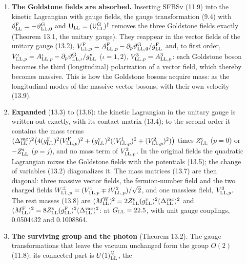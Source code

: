 \documentclass[
  10pt,
]{article}
\providecommand{\tightlist}{%
  \setlength{\itemsep}{0pt}\setlength{\parskip}{0pt}}
\begin{document}
\begin{enumerate}
\def\labelenumi{\arabic{enumi}.}
\tightlist
\item
  \textbf{The Goldstone fields are absorbed.} Inserting SFBSv (11.9)
  into the kinetic Lagrangian with gauge fields, the gauge
  transformation (9.4) with
  \(\theta^{\rm F}_{\rm LL}=-\vartheta^{\rm G}_{{\rm LL},0}\) and
  \(\mathsf U_{\rm LL}=(\mathsf U^{\rm G}_{\rm LL})^\dagger\) removes
  the three Goldstone fields exactly (Theorem 13.1, the unitary gauge).
  They reappear in the vector fields of the unitary gauge (13.2),
  \(V^{\rm F}_{{\rm LL},p}=A^{\rm F}_{{\rm LL},p}-\partial_p\vartheta^{\rm G}_{{\rm LL},0}/g^{\rm F}_{\rm LL}\)
  and, to first order,
  \(V^\iota_{{\rm LL},p}=A^\iota_{{\rm LL},p}-\partial_p\vartheta^{\rm G}_{{\rm LL},\iota}/g^{\rm v}_{\rm LL}\)
  (\(\iota=1,2\)), \(V^3_{{\rm LL},p}=A^3_{{\rm LL},p}\): each Goldstone
  boson becomes the third (longitudinal) polarization of a vector field,
  which thereby becomes massive. This is how the Goldstone bosons
  acquire mass: as the longitudinal modes of the massive vector bosons,
  with their own velocity (13.9).
\item
  \textbf{Expanded} (13.3) to (13.6): the kinetic Lagrangian in the
  unitary gauge is written out exactly, with its contact matrix (13.4);
  to the second order it contains the mass terms
  \((\Delta^{\rm vac}_{\rm LL})^2\big(4(g^{\rm F}_{\rm LL})^2(V^{\rm F}_{{\rm LL},p})^2+(g^{\rm v}_{\rm LL})^2((V^1_{{\rm LL},p})^2+(V^2_{{\rm LL},p})^2)\big)\)
  times \(Z^{\rm t}_{\rm LL}\) (\(p=0\)) or \(-Z^{\rm s}_{\rm LL}\)
  (\(p=j\)), and no mass term of \(V^3_{{\rm LL},p}\). In the original
  fields the quadratic Lagrangian mixes the Goldstone fields with the
  potentials (13.5); the change of variables (13.2) diagonalizes it. The
  mass matrices (13.7) are then diagonal: three massive vector fields,
  the fermion-number field and the two charged fields
  \(W^\pm_{{\rm LL},p}=(V^1_{{\rm LL},p}\mp iV^2_{{\rm LL},p})/\sqrt2\),
  and one massless field, \(V^3_{{\rm LL},p}\). The rest masses (13.8)
  are
  \((M^{\rm W}_{\rm LL})^2=2Z^{\rm s}_{\rm LL}(g^{\rm v}_{\rm LL})^2(\Delta^{\rm vac}_{\rm LL})^2\)
  and
  \((M^{\rm F}_{\rm LL})^2=8Z^{\rm s}_{\rm LL}(g^{\rm F}_{\rm LL})^2(\Delta^{\rm vac}_{\rm LL})^2\):
  at \(G_{\rm LL}=22.5\), with unit gauge couplings, 0.0504432 and
  0.1008864.
\item
  \textbf{The surviving group and the photon} (Theorem 13.2). The gauge
  transformations that leave the vacuum unchanged form the group
  \(O(2)\) (11.8); its connected part is \(U(1)^{\rm Q}_{\rm LL}\), the

\end{enumerate}
\end{document}
